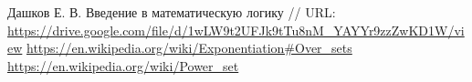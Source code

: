 \documentclass{article}
\begin{document}
  \vfill
  \begin{thebibliography}{9}
     Дашков Е. В. Введение в математическую логику // URL: \url{https://drive.google.com/file/d/1wLW9t2UFJk9tTu8nM_YAYYr9zzZwKD1W/view}
     \url{https://en.wikipedia.org/wiki/Exponentiation#Over_sets}
     \url{https://en.wikipedia.org/wiki/Power_set}
  \end{thebibliography}
\end{document}
